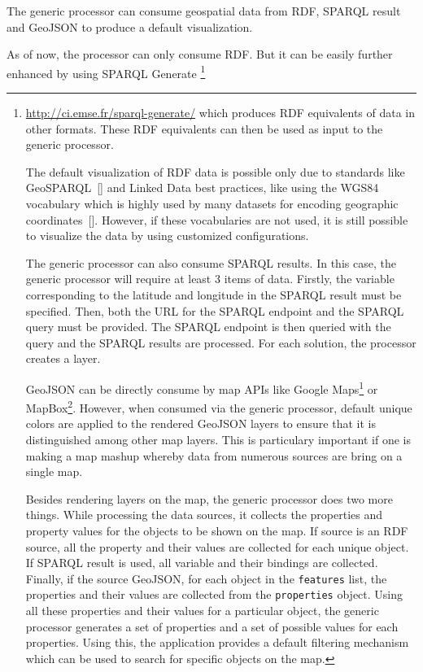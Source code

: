 \documentclass[a4paper,pagenum,english]{rnti}
\begin{document}
The generic processor can consume geospatial data from RDF, SPARQL result and GeoJSON to produce a default visualization. 


As of now, the processor can only consume RDF. But it can be easily further enhanced by using SPARQL Generate \footnote{\url{http://ci.emse.fr/sparql-generate/} which produces RDF equivalents of data in other formats. These RDF equivalents can then be used as input to the generic processor.


The default visualization of RDF data is possible only due to standards like GeoSPARQL~[\cite{perry2012ogc}] and Linked Data best practices, like using the WGS84 vocabulary which is highly used by many datasets for encoding geographic coordinates~[\cite{schmachtenberg2014adoption}]. However, if these vocabularies are not used, it is still possible to visualize the data by using customized configurations.

The generic processor can also consume SPARQL results. In this case, the generic processor will require at least 3 items of data. Firstly,  the variable corresponding to the latitude and longitude in the SPARQL result must be specified. Then, both the URL for the SPARQL endpoint and the SPARQL query must be provided. The SPARQL endpoint is then queried with the query and the SPARQL results are processed. For each solution, the processor creates a layer.

GeoJSON can be directly consume by map APIs like Google Maps\footnote{\url{https://developers.google.com/maps/}} or MapBox\footnote{\url{https://www.mapbox.com}}. However, when consumed via the generic processor, default unique colors are applied to the rendered GeoJSON layers to ensure that it is distinguished among other map layers. This is particulary important if one is making a map mashup whereby data from numerous sources are bring on a single map.

Besides rendering layers on the map, the generic processor does two more things. While processing the data sources, it collects the properties and property values for the objects to be shown on the map. If source is an RDF source, all the property and their values are collected for each unique object. If SPARQL result is used, all variable and their bindings are collected. Finally, if the source GeoJSON, for each object in the \texttt{features} list, the properties and their values are collected from the \texttt{properties} object. Using all these properties and their values for a particular object, the generic processor generates a set of properties and a set of possible values for each properties. Using this, the application provides a default filtering mechanism which can be used to search for specific objects on the map.

}
\end{document}
